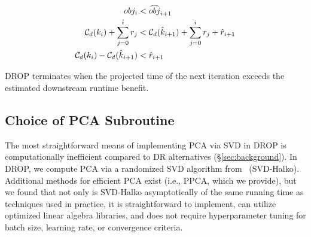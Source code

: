 \vspace{-.4cm}
\begin{align}
  obj_i &< \widehat{obj}_{i+1} \nonumber \\
  \mathcal{C}_{\color{black}d}(k_i) + \sum_{j=0}^i r_j &< \mathcal{C}_{\color{black}d}(\hat{k}_{i+1}) + \sum_{j=0}^{i} r_j + \hat{r}_{i+1} \nonumber \\
  \mathcal{C}_{\color{black}d}(k_i) - \mathcal{C}_{\color{black}d}(\hat{k}_{i+1}) &< \hat{r}_{i+1}  \label{eq:check}
\end{align}

DROP terminates when the projected time of the next iteration exceeds the estimated downstream runtime benefit. 

\subsection{Choice of PCA Subroutine}
\label{subsec:pcaroutine}

The most straightforward means of implementing PCA via SVD in DROP is computationally inefficient compared to DR alternatives (\S\ref{sec:background}).  
In DROP, we compute PCA via a randomized SVD algorithm from~\cite{tropp} (SVD-Halko).
Additional methods for efficient PCA exist (i.e., PPCA, which we provide), but we found that not only is SVD-Halko asymptotically of the same running time as techniques used in practice, it is straightforward to implement, can utilize optimized linear algebra libraries, and does not require hyperparameter tuning for batch size, learning rate, or convergence criteria.  

